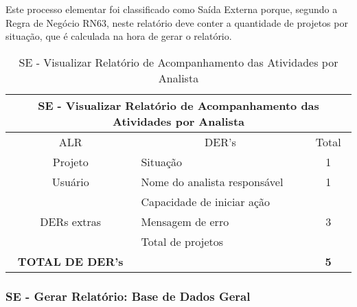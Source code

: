       Este processo elementar foi classificado como Saída Externa porque, segundo a Regra de Negócio RN63, neste relatório
    deve conter a quantidade de projetos por situação, que é calculada na hora de gerar o relatório.
      
      \begin{table}[!h]
      \centering
      \caption{SE - Visualizar Relatório de Acompanhamento das Atividades por Analista}
      \label{se_visualizar_relatorio_acompanhamento_analista}
      \begin{tabular}{|c|l|c|}
      \hline
      \multicolumn{3}{|c|}{SE - Visualizar Relatório de Acompanhamento das Atividades por Analista} \\ \hline
      ALR                               & \multicolumn{1}{c|}{DER's}       & Total                  \\ \hline
      Projeto                           & Situação                         & 1                      \\ \hline
      Usuário                           & Nome do analista responsável     & 1                      \\ \hline
      \multirow{3}{*}{DERs extras}      & Capacidade de iniciar ação       & \multirow{3}{*}{3}     \\ \cline{2-2}
					& Mensagem de erro                 &                        \\ \cline{2-2}
					& Total de projetos                &                        \\ \hline
      \textbf{TOTAL DE DER's}           &                                  & \textbf{5}             \\ \hline
      \end{tabular}
      \end{table}
  

    
  \subsubsection{SE - Gerar Relatório: Base de Dados Geral}
   
